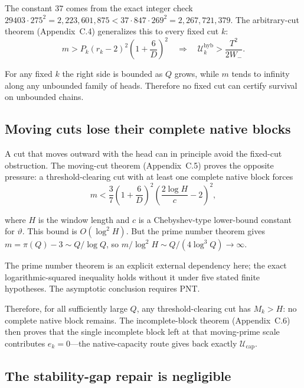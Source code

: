 The constant $37$ comes from the exact integer check
$29403\cdot275^2=2{,}223{,}601{,}875\lt37\cdot847\cdot269^2=2{,}267{,}721{,}379$.
The arbitrary-cut theorem (Appendix~C.4) generalizes this to every fixed
cut $k$:
\begin{equation*}
m>P_k(r_k-2)^2\left(1+\frac6D\right)^2
\quad\Longrightarrow\quad
\mathcal U_k^{\mathrm{hyb}}>\frac{T^2}{2W_-}.
\end{equation*}

For any fixed $k$ the right side is bounded as $Q$ grows, while $m$ tends to
infinity along any unbounded family of heads. Therefore no fixed cut can
certify survival on unbounded chains.

\subsection{Moving cuts lose their complete native blocks}
\label{sec:moving-cuts-lose-blocks}

A cut that moves outward with the head can in principle avoid the fixed-cut
obstruction. The moving-cut theorem (Appendix~C.5) proves the opposite
pressure: a threshold-clearing cut with at least one complete native block
forces
\begin{equation*}
m\lt\frac37\left(1+\frac6D\right)^2
\left(\frac{2\log H}{c}-2\right)^2,
\end{equation*}

where $H$ is the window length and $c$ is a Chebyshev-type lower-bound
constant for $\vartheta$. This bound is $O(\log^2 H)$. But the prime number
theorem gives $m=\pi(Q)-3\sim Q/\log Q$, so $m/\log^2H\sim Q/(4\log^3Q)\to\infty$.

The prime number theorem is an explicit external dependency here; the exact
logarithmic-squared inequality holds without it under five stated finite
hypotheses. The asymptotic conclusion requires PNT.

Therefore, for all sufficiently large $Q$, any threshold-clearing cut has
$M_k>H$: no complete native block remains. The incomplete-block theorem
(Appendix~C.6) then proves that the single incomplete block left at that
moving-prime scale contributes $e_k=0$---the native-capacity route gives back
exactly $\mathcal U_{\mathrm{cap}}$.

\subsection{The stability-gap repair is negligible}
\label{sec:stability-gap-negligible}

